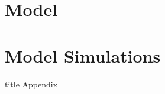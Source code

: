 \documentclass[compress, 8pt]{beamer}
\begin{document}
\section[Model]{Model}



\miniframesoff
\section[Simulations]{Model Simulations}
\begin{frame}
    \tableofcontents[currentsection]
\end{frame}
\miniframeson



% 

\miniframesoff
\begin{frame}[noframenumbering]
\begin{beamercolorbox}[sep=11pt,center]{title}
Appendix
\end{beamercolorbox}
\end{frame}


\end{document}
